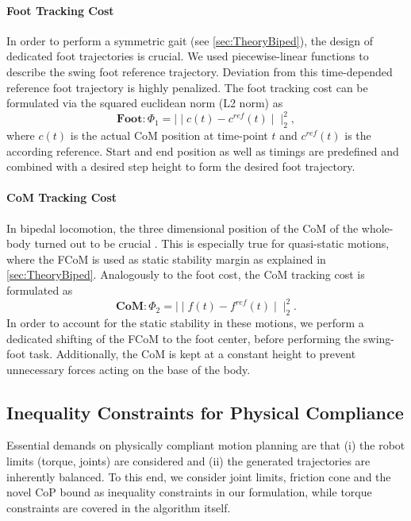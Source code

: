 \paragraph{Foot Tracking Cost}
In order to perform a symmetric gait (see \cref{sec:TheoryBiped}), the design of dedicated foot trajectories is crucial. We used piecewise-linear functions to describe the swing foot reference trajectory. Deviation from this time-depended reference foot trajectory is highly penalized. The foot tracking cost can be formulated via the squared euclidean norm (L2 norm) as
\begin{equation*} 
\textbf{Foot}: \Phi_1=\mid\mid c(t)-c^{ref}(t)\mid\mid^2_2,
\end{equation*}
where $c(t)$ is the actual \gls{CoM} position at time-point $t$ and $c^{ref}(t)$ is the according reference. Start and end position as well as timings are predefined and combined with a desired step height to form the desired foot trajectory. 

\paragraph{\Gls{CoM} Tracking Cost}
In bipedal locomotion, the three dimensional position of the \gls{CoM} of the whole-body turned out to be crucial \cite{carpentier2017centre}. This is especially true for quasi-static motions, where the \gls{FCoM} is used as static stability margin as explained in \cref{sec:TheoryBiped}. Analogously to the foot cost, the \gls{CoM} tracking cost is formulated as
\begin{equation*} 
\textbf{CoM}: \Phi_2=\mid\mid f(t)-f^{ref}(t)\mid\mid^2_2.
\end{equation*}
In order to account for the static stability in these motions, we perform a dedicated shifting of the \gls{FCoM} to the foot center, before performing the swing-foot task. Additionally, the \gls{CoM} is kept at a constant height to prevent unnecessary forces acting on the base of the body. 

\subsection{Inequality Constraints for Physical Compliance}
Essential demands on physically compliant motion planning are that (i) the robot limits (torque, joints) are considered and (ii) the generated trajectories are inherently balanced. To this end, we consider joint limits, friction cone and the novel \gls{CoP} bound as inequality constraints in our formulation, while torque constraints are covered in the algorithm itself.


